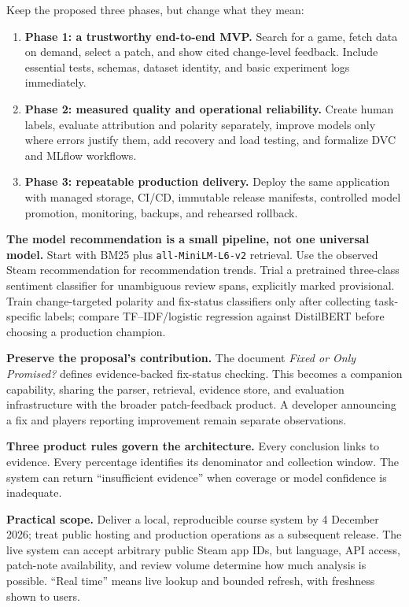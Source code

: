 \documentclass[10pt,letterpaper]{article}
\newcommand{\key}[1]{\textbf{\color{ink}#1}}
\newenvironment{decision}{\begin{tcolorbox}[colback=pale,colframe=teal,boxrule=0.5pt,arc=2pt,left=9pt,right=9pt,top=6pt,bottom=6pt]}{\end{tcolorbox}}
\begin{document}
Keep the proposed three phases, but change what they mean:
\begin{enumerate}
\item \key{Phase 1: a trustworthy end-to-end MVP.} Search for a game, fetch data on demand, select a patch, and show cited change-level feedback. Include essential tests, schemas, dataset identity, and basic experiment logs immediately.
\item \key{Phase 2: measured quality and operational reliability.} Create human labels, evaluate attribution and polarity separately, improve models only where errors justify them, add recovery and load testing, and formalize DVC and MLflow workflows.
\item \key{Phase 3: repeatable production delivery.} Deploy the same application with managed storage, CI/CD, immutable release manifests, controlled model promotion, monitoring, backups, and rehearsed rollback.
\end{enumerate}

\key{The model recommendation is a small pipeline, not one universal model.} Start with BM25 plus \texttt{all-MiniLM-L6-v2} retrieval. Use the observed Steam recommendation for recommendation trends. Trial a pretrained three-class sentiment classifier for unambiguous review spans, explicitly marked provisional. Train change-targeted polarity and fix-status classifiers only after collecting task-specific labels; compare TF--IDF/logistic regression against DistilBERT before choosing a production champion.

\key{Preserve the proposal's contribution.} The document \emph{Fixed or Only Promised?} defines evidence-backed fix-status checking. This becomes a companion capability, sharing the parser, retrieval, evidence store, and evaluation infrastructure with the broader patch-feedback product. A developer announcing a fix and players reporting improvement remain separate observations.

\begin{decision}
\key{Three product rules govern the architecture.} Every conclusion links to evidence. Every percentage identifies its denominator and collection window. The system can return ``insufficient evidence'' when coverage or model confidence is inadequate.
\end{decision}

\key{Practical scope.} Deliver a local, reproducible course system by 4 December 2026; treat public hosting and production operations as a subsequent release. The live system can accept arbitrary public Steam app IDs, but language, API access, patch-note availability, and review volume determine how much analysis is possible. ``Real time'' means live lookup and bounded refresh, with freshness shown to users.
\end{document}
